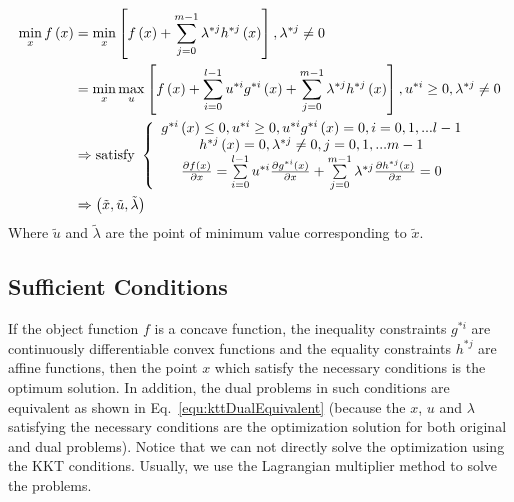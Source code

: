\documentclass[runningheads,openany]{xhlPaper}
\begin{document}
\begin{equation}
\label{equ:kttNecessaryConditions}
\begin{aligned}
\mathop {\min }\limits_x f\left( x \right) &= \mathop {\min }\limits_x \left[ {f\left( x \right) + \sum\limits_{j = 0}^{m - 1} {{\lambda ^{*j}}{h^{*j}}\left( x \right)} } \right],{\lambda ^{*j}} \ne 0\\
 &= \mathop {\min }\limits_x \mathop {\max }\limits_u \left[ {f\left( x \right) + \sum\limits_{i = 0}^{l - 1} {{u^{*i}}{g^{*i}}\left( x \right)}  + \sum\limits_{j = 0}^{m - 1} {{\lambda ^{*j}}{h^{*j}}\left( x \right)} } \right],{u^{*i}} \ge 0,{\lambda ^{*j}} \ne 0\\
 &\Rightarrow {\rm{satisfy}}\ \left\{ {\begin{array}{*{20}{c}}
{{g^{*i}}\left( x \right) \le 0,{u^{*i}} \ge 0,{u^{*i}}{g^{*i}}\left( x \right) = 0,i = 0,1,...l - 1}\\
{{h^{*j}}\left( x \right) = 0,{\lambda ^{*j}} \ne 0,j = 0,1,...m - 1}\\
{\frac{{\partial f\left( x \right)}}{{\partial x}} =  {\sum\limits_{i = 0}^{l - 1} {{u^{*i}}} \frac{{\partial {g^{*i}}\left( x \right)}}{{\partial x}} + \sum\limits_{j = 0}^{m - 1} {{\lambda ^{*j}}} \frac{{\partial {h^{*j}}\left( x \right)}}{{\partial x}}}} = 0
\end{array}} \right.\\
 &\Rightarrow \left( {\tilde x,\tilde u,\tilde \lambda } \right)
\end{aligned}
\end{equation}
Where $\tilde{u}$ and $\tilde{\lambda}$ are the point of minimum value corresponding to $\tilde{x}$.

\subsection{Sufficient Conditions}
\label{sec:kktSufficientConditions}
If the object function $f$ is a concave function, the inequality constraints $g^{*i}$ are continuously differentiable convex functions and the equality constraints $h^{*j}$ are affine functions, then the point $x$ which satisfy the necessary conditions is the optimum solution. In addition, the dual problems  in such conditions are equivalent as shown in Eq.~\ref{equ:kttDualEquivalent} (because the $x$, $u$ and $\lambda$ satisfying the necessary conditions are the optimization solution for both original and dual problems). Notice that we can not directly solve the optimization using the KKT conditions. Usually, we use the Lagrangian multiplier method to solve the problems.
\end{document}
